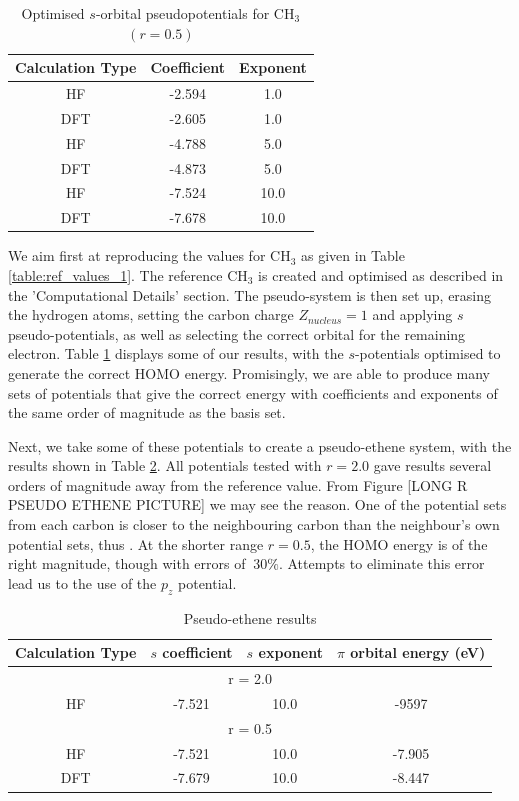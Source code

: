 \documentclass[journal=jctcce,manuscript=article]{achemso}
\begin{document}
\begin{table}[ht]
\caption{Optimised \(s\)-orbital pseudopotentials for CH\(_{3}\) \((r = 0.5)\)}
\begin{tabular}{c c c}
\hline\hline
Calculation Type & Coefficient & Exponent \\ [0.5ex]
\hline
HF & -2.594 & 1.0 \\
DFT & -2.605 & 1.0 \\
\hline
HF & -4.788 & 5.0 \\
DFT & -4.873 & 5.0 \\
\hline
HF & -7.524 & 10.0 \\
DFT & -7.678 & 10.0 \\
\hline
\end{tabular}
\label{table:ch3_s_potentials}
\end{table}

We aim first at reproducing the values for CH\(_{3}\) as given in Table \ref{table:ref_values_1}. The reference CH\(_{3}\) is created and optimised as described in the 'Computational Details' section. The pseudo-system is then set up, erasing the hydrogen atoms, setting the carbon charge \(Z_{nucleus} = 1\) and applying \(s\) pseudo-potentials, as well as selecting the correct orbital for the remaining electron. Table \ref{table:ch3_s_potentials} displays some of our results, with the \(s\)-potentials optimised to generate the correct HOMO energy. Promisingly, we are able to produce many sets of potentials that give the correct energy with coefficients and exponents of the same order of magnitude as the basis set.

Next, we take some of these potentials to create a pseudo-ethene system, with the results shown in Table \ref{table:ethene_s_pseudo}. All potentials tested with \(r = 2.0\) gave results several orders of magnitude away from the reference value. From Figure [LONG R PSEUDO ETHENE PICTURE] we may see the reason. One of the potential sets from each carbon is closer to the neighbouring carbon than the neighbour's own potential sets, thus . At the shorter range \(r = 0.5\), the HOMO energy is of the right magnitude, though with errors of \(~ 30\%\). Attempts to eliminate this error lead us to the use of the \(p_{z}\) potential. 

\begin{table}[ht]
\caption{Pseudo-ethene results}
\begin{tabular}{c c c c}
\hline\hline
Calculation Type & \(s\) coefficient & \(s\) exponent & \( \pi \) orbital energy (eV) \\
\hline
\multicolumn{4}{c}{r = 2.0} \\
\hline
HF & -7.521 & 10.0 & -9597 \\
\hline
\multicolumn{4}{c}{r = 0.5} \\
\hline
HF & -7.521 & 10.0 & -7.905 \\
DFT & -7.679 & 10.0 & -8.447 \\
\hline
\end{tabular}
\label{table:ethene_s_pseudo}
\end{table}
\end{document}
